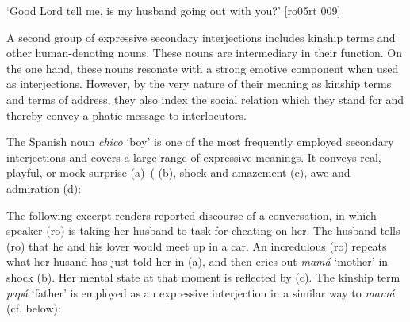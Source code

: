 \glt ‘Good Lord tell me, is my husband going out with you?’ [ro05rt 009]
\z

A second group of expressive secondary interjections includes kinship terms and other human-denoting nouns. These nouns are intermediary in their function. On the one hand, these nouns resonate with a strong emotive component when used as interjections. However, by the very nature of their meaning as kinship terms and terms of address, they also index the social relation which they stand for and thereby convey a phatic message to interlocutors. 


The Spanish noun \textit{chico} ‘boy’ is one of the most frequently employed secondary interjections and covers a large range of expressive meanings. It conveys real, playful, or mock surprise (a)–( (b), shock and amazement (c), awe and admiration (d):



\ea%
    \label{ex:key:1644}
\z\z

The following excerpt renders reported discourse of a conversation, in which speaker (ro) is taking her husband to task for cheating on her. The husband tells (ro) that he and his lover would meet up in a car. An incredulous (ro) repeats what her husand has just told her in (a), and then cries out \textit{mamá} ‘mother’ in shock (b). Her mental state at that moment is reflected by (c). The kinship term \textit{papá} ‘father’ is employed as an expressive interjection in a similar way to \textit{mamá} (cf.  below):


